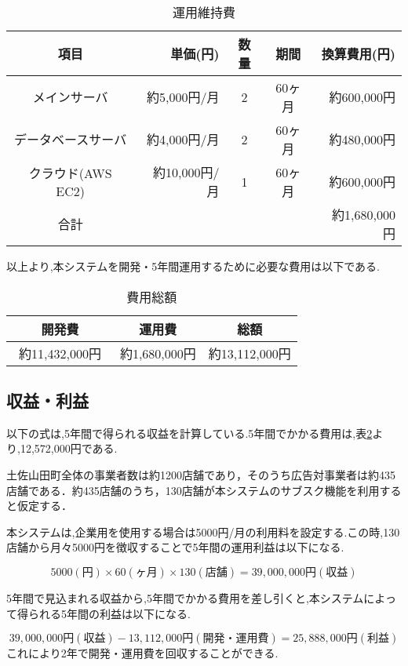 \begin{table}[h]
  \centering
  \caption{運用維持費}
  \label{fig:Q11}
  \begin{tabular}{crccr}
  \hline
  項目  & 単価(円) & 数量  & 期間 & 換算費用(円) \\ \hline\hline
 
メインサーバ  & 約5,000円/月 & 2& 60ヶ月  & 約600,000円 \\ \hline

データベースサーバ & 約4,000円/月 &2& 60ヶ月 & 約480,000円 \\\hline

クラウド(AWS EC2)  &約10,000円/月&1 &60ヶ月 & 約600,000円 \\ \hline\hline

合計 &  & & & 約1,680,000円\\ \hline
\end{tabular}
\end{table}

以上より,本システムを開発・5年間運用するために必要な費用は以下である.
\begin{table}[h]
  \centering
  \caption{費用総額}
  \label{fig:Q12}
  \begin{tabular}{ccc}
  \hline
  開発費 & 運用費 & 総額  \\ \hline\hline
 約11,432,000円　& 約1,680,000円 & 約13,112,000円\\ \hline

\end{tabular}
\end{table}


\subsection{収益・利益}
以下の式は,5年間で得られる収益を計算している.5年間でかかる費用は,表\ref{fig:Q12}より,12,572,000円である.\par
土佐山田町全体の事業者数は約1200店舗であり，そのうち広告対事業者は約435店舗である．約435店舗のうち，130店舗が本システムのサブスク機能を利用すると仮定する．

本システムは,企業用を使用する場合は5000円/月の利用料を設定する.この時,130店舗から月々5000円を徴収することで5年間の運用利益は以下になる.\par

\[5000(円)\times 60(ヶ月)\times 130(店舗)=39,000,000円(収益)\]


5年間で見込まれる収益から,5年間でかかる費用を差し引くと,本システムによって得られる5年間の利益は以下になる.

\[39,000,000円(収益)-13,112,000円(開発・運用費)=25,888,000円(利益)\]
これにより2年で開発・運用費を回収することができる.









